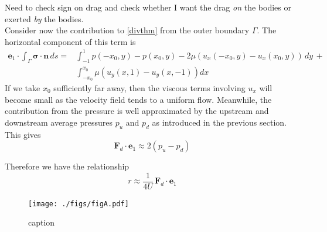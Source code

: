 \documentclass[3p]{elsarticle}
\newcommand{\nick}[1]{ {\color{red} #1} }
\newcommand{\nn}{{\mathbf{n}}}
\newcommand{\bvec}[1]{\mathbf{#1}}
\newcommand{\pup}{p_u}
\newcommand{\pdn}{p_d}
\newcommand{\stress}{{\boldsymbol \sigma}}
\newcommand{\FD}{\bvec{F}_d}
\newcommand{\ex}{ {\bvec{e}}_1}
\begin{document}
\nick{Need to check sign on drag and check whether I want the drag {\em on} the bodies or exerted {\em by} the bodies.} \\

Consider now the contribution to \eqref{divthm} from the outer boundary $\Gamma$. The horizontal component of this term is
\begin{align}
\ex \cdot \int_{\Gamma} \stress \cdot \nn \, ds = 
& \int_{-1}^{1} p(-x_0, y) - p(x_0, y) - 2\mu (u_x(-x_0,y) - u_x(x_0,y)) \, dy \, + \\
& \int_{-x_0}^{x_0} \mu (u_y(x,1) - u_y(x,-1)) dx
\end{align}
If we take $x_0$ sufficiently far away, then the viscous terms involving $u_x$ will become small as the velocity field tends to a uniform flow. Meanwhile, the contribution from the pressure is well approximated by the upstream and downstream average pressures $\pup$ and $\pdn$ as introduced in the previous section. This gives 
\begin{equation}
\FD \cdot \ex \approx 2 (\pup - \pdn)
\end{equation}

Therefore we have the relationship
\begin{equation}
r \approx \frac{1}{4 U}  \, \FD \cdot \ex
\end{equation}

\begin{figure}%
\centering \label{}
\texttt{[image: ./figs/figA.pdf]}
\caption{caption}
\end{figure}




\end{document}
